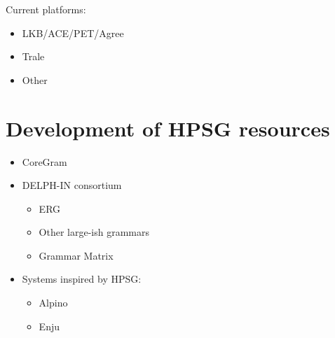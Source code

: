 \documentclass[output=paper,nonflat]{langsci/langscibook}
\begin{document}
Current platforms:
    \begin{itemize}
    \item LKB/ACE/PET/Agree
    \item Trale
    \item Other
    \end{itemize}


\section{Development of HPSG resources}
\label{cl:resources}


\begin{itemize}
 \item  CoreGram
 \item  DELPH-IN consortium
    \begin{itemize}
    \item ERG
    \item Other large-ish grammars
    \item Grammar Matrix
    \end{itemize}
 \item Systems inspired by HPSG:
   \begin{itemize}
     \item Alpino
     \item Enju
   \end{itemize}
\end{itemize}





\end{document}
